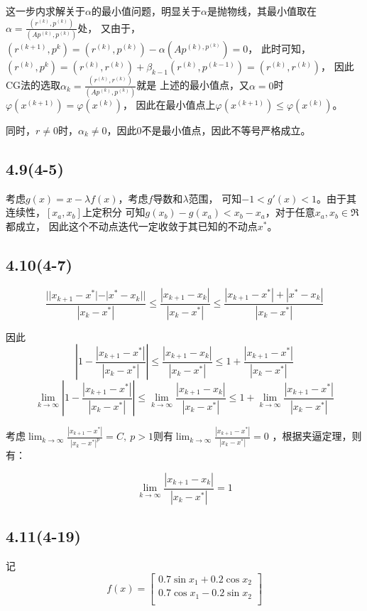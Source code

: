 \documentclass[UTF8,zihao=5]{ctexart}
\begin{document}
这一步内求解关于$\alpha$的最小值问题，明显关于$\alpha$是抛物线，其最小值取在
$\alpha=\frac{(r^{(k)}, p^{(k)})}{(Ap^{(k)},p^{(k)})}$处，
又由于，$(r^{(k+1)},p^{k})=(r^{(k)},p^{(k)}) - \alpha(Ap^{(k),p^{(k)}})=0$，
此时可知，$(r^{(k)},p^{k})=(r^{(k)},r^{(k)})+\beta_{k-1}(r^{(k)},p^{(k-1)})=(r^{(k)},r^{(k)})$，
因此CG法的选取$\alpha_k=\frac{(r^{(k)}, r^{(k)})}{(Ap^{(k)},p^{(k)})}$就是
上述的最小值点，又$\alpha=0$时$\varphi(x^{(k+1)})=\varphi(x^{(k)})$，
因此在最小值点上$\varphi(x^{(k+1)})\leq\varphi(x^{(k)})$。

同时，$r\neq0$时，$\alpha_k\neq0$，因此$0$不是最小值点，因此不等号严格成立。

\subsection*{4.9(4-5)}
考虑$g(x)=x-\lambda f(x)$，考虑$f$导数和$\lambda$范围，
可知$-1<g'(x)<1$。由于其连续性，$[x_a,x_b]$上定积分
可知$g(x_b)-g(x_a)<x_b-x_a$，对于任意$x_a,x_b\in\Re$都成立，
因此这个不动点迭代一定收敛于其已知的不动点$x^*$。

\subsection*{4.10(4-7)}

$$
    \frac{||x_{k+1}-x^*| - |x^*-x_k|| }{|x_{k}-x^*|}\leq\frac{|x_{k+1}-x_k|}{|x_{k}-x^*|}\leq\frac{|x_{k+1}-x^*| + |x^*-x_k| }{|x_{k}-x^*|}
$$

因此
$$
    \left|1-\frac{|x_{k+1}-x^*|}{|x_{k}-x^*|}\right|\leq\frac{|x_{k+1}-x_k|}{|x_{k}-x^*|}\leq 1+\frac{|x_{k+1}-x^*|}{|x_{k}-x^*|}
$$
$$
    \lim_{k\rightarrow\infty}\left|1-\frac{|x_{k+1}-x^*|}{|x_{k}-x^*|}\right|\leq\lim_{k\rightarrow\infty}\frac{|x_{k+1}-x_k|}{|x_{k}-x^*|}\leq 1+\lim_{k\rightarrow\infty}\frac{|x_{k+1}-x^*|}{|x_{k}-x^*|}
$$

考虑$\lim_{k\rightarrow\infty}\frac{|x_{k+1}-x^*|}{|x_{k}-x^*|^p} = C,\ p>1$则有$\lim_{k\rightarrow\infty}\frac{|x_{k+1}-x^*|}{|x_{k}-x^*|}=0$
，根据夹逼定理，则有：

$$
    \lim_{k\rightarrow\infty}\frac{|x_{k+1}-x_k|}{|x_{k}-x^*|}=1
$$

\subsection*{4.11(4-19)}

记
$$
    f(x)=\begin{bmatrix}
        0.7\sin{x_1}+0.2\cos{x_2} \\
        0.7\cos{x_1}-0.2\sin{x_2} \\
    \end{bmatrix}
$$
\end{document}

